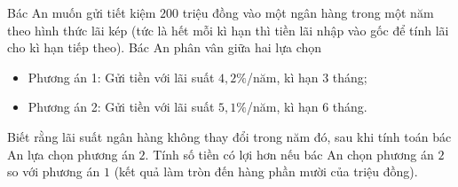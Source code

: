 \begin{ex}%
	Bác An muốn gửi tiết kiệm $200$ triệu đồng vào một ngân hàng trong một năm theo hình thức lãi kép (tức là hết mỗi kì hạn thì tiền lãi nhập vào gốc để tính lãi cho kì hạn tiếp theo). Bác An phân vân giữa hai lựa chọn
	\begin{itemize}
		\item Phương án 1: Gửi tiền với lãi suất $4{,}2\%$/năm, kì hạn $3$ tháng;
		\item Phương án 2: Gửi tiền với lãi suất $5{,}1\%$/năm, kì hạn $6$ tháng.
	\end{itemize}
	Biết rằng lãi suất ngân hàng không thay đổi trong năm đó, sau khi tính toán bác An lựa chọn phương án $2$. Tính số tiền có lợi hơn nếu bác An chọn phương án $2$ so với phương án $1$ (kết quả làm tròn đến hàng phần mười của triệu đồng).
	\par
\end{ex}
